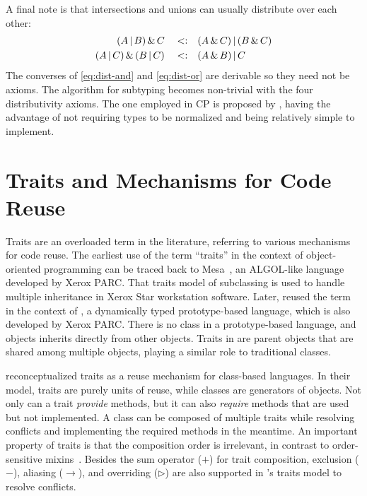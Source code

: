 A final note is that intersections and unions can usually distribute over each other:
\begin{align}
(A \,|\, B) \,\&\, C  \quad          <:& \quad  (A \,\&\, C) \,|\, (B \,\&\, C) \label{eq:dist-and} \\
(A \,|\, C) \,\&\, (B \,|\, C)  \quad <:& \quad  (A \,\&\, B) \,|\, C \label{eq:dist-or}
\end{align}
The converses of \autoref{eq:dist-and} and \autoref{eq:dist-or} are derivable so
they need not be axioms. The algorithm for subtyping becomes non-trivial with
the four distributivity axioms. The one employed in CP is proposed by
\citet{huang2021distributing}, having the advantage of not requiring types to be
normalized and being relatively simple to implement.

\section{Traits and Mechanisms for Code Reuse}

Traits are an overloaded term in the literature, referring to various mechanisms
for code reuse. The earliest use of the term ``traits'' in the context of
object-oriented programming can be traced back to Mesa~\citep{curry1982traits},
an ALGOL-like language developed by Xerox PARC. That traits model of subclassing
is used to handle multiple inheritance in Xerox Star workstation software.
Later, \citet{ungar1991organizing} reused the term in the context of \self, a
dynamically typed prototype-based language, which is also developed by Xerox
PARC. There is no class in a prototype-based language, and objects inherits
directly from other objects. Traits in \self are parent objects that are shared
among multiple objects, playing a similar role to traditional classes.

\citet{ducasse2006traits} reconceptualized traits as a reuse mechanism for
class-based languages. In their model, traits are purely units of reuse, while
classes are generators of objects. Not only can a trait \emph{provide} methods,
but it can also \emph{require} methods that are used but not implemented. A
class can be composed of multiple traits while resolving conflicts and
implementing the required methods in the meantime. An important property of
traits is that the composition order is irrelevant, in contrast to
order-sensitive mixins~\citep{bracha1990mixin}. Besides the sum operator ($+$)
for trait composition, exclusion ($-$), aliasing ($\to$), and overriding
($\rhd$) are also supported in \citeauthor{ducasse2006traits}'s traits model to
resolve conflicts.


